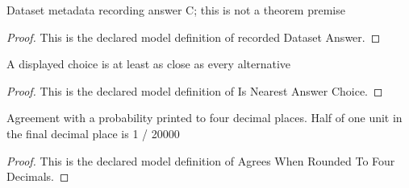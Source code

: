 \begin{definition}
  \label{def:physics:phyx-mini-0600:phyxminiproblems-problemphyxmini0600-recordeddatasetanswer}
  Dataset metadata recording answer C; this is not a theorem premise
\end{definition}
\begin{proof}
  This is the declared model definition of recorded Dataset Answer.
\end{proof}
\begin{definition}
  \label{def:physics:phyx-mini-0600:phyxminiproblems-problemphyxmini0600-isnearestanswerchoice}
  A displayed choice is at least as close as every alternative
\end{definition}
\begin{proof}
  This is the declared model definition of Is Nearest Answer Choice.
\end{proof}
\begin{definition}
  \label{def:physics:phyx-mini-0600:phyxminiproblems-problemphyxmini0600-agreeswhenroundedtofourdecimals}
  Agreement with a probability printed to four decimal places. Half of one unit in the final decimal place is 1 / 20000
\end{definition}
\begin{proof}
  This is the declared model definition of Agrees When Rounded To Four Decimals.
\end{proof}

